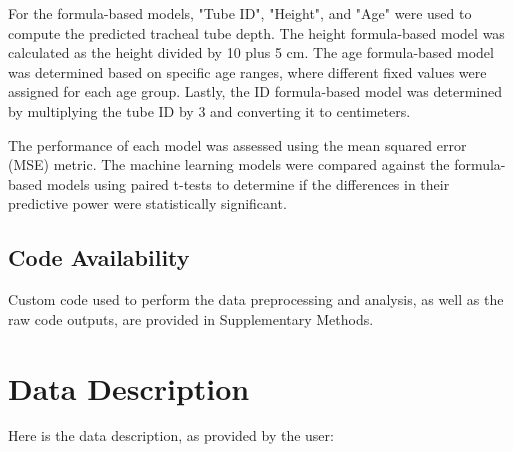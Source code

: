 \documentclass[11pt]{article}
\begin{document}
For the formula-based models, "Tube ID", "Height", and "Age" were used to compute the predicted tracheal tube depth. The height formula-based model was calculated as the height divided by 10 plus 5 cm. The age formula-based model was determined based on specific age ranges, where different fixed values were assigned for each age group. Lastly, the ID formula-based model was determined by multiplying the tube ID by 3 and converting it to centimeters.

The performance of each model was assessed using the mean squared error (MSE) metric. The machine learning models were compared against the formula-based models using paired t-tests to determine if the differences in their predictive power were statistically significant.\subsection*{Code Availability}

Custom code used to perform the data preprocessing and analysis, as well as the raw code outputs, are provided in Supplementary Methods.


\clearpage
\appendix

\section{Data Description} \label{sec:data_description} Here is the data description, as provided by the user:
\end{document}
